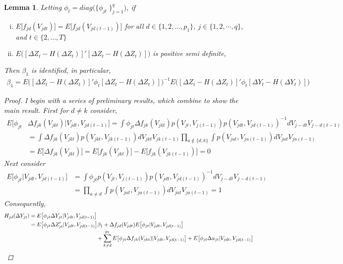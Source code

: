 \documentclass[10pt]{article}
\newtheorem{lemma}{Lemma}
\begin{document}
\begin{lemma}
Letting $\phi_{t} = diag\big( \{\phi_{jt}\;\}_{j=1}^q \big)$, if
\begin{enumerate}[i.)]
\item $E\big[ f_{jd}(V_{jdt})\big] = E\big[ f_{jd}(V_{jd(t-1)}) \big]
$ for all $d\in \{1,2, \ldots , p_1\}$, $j\in \{1,2, \cdots , q\}$, and $t\in \{2, \ldots , T\}$
%
\item $E \Big( [\Delta Z_t - H(\Delta Z_t)]' [\Delta Z_t - H(\Delta Z_t)] \Big)$ is positive semi definite,
%
\end{enumerate}
Then $\beta_1$ is identified, in particular,
\begin{align*}
\beta_1 = E \Big( [\Delta Z_t - H(\Delta Z_t)]' \phi_{t} [\Delta Z_t - H(\Delta Z_t)] \Big)^{-1}E \Big( [\Delta Z_t - H(\Delta Z_t)]' \phi_{t} [\Delta Y_t - H(\Delta Y_t)] \Big)
\end{align*}
%
\begin{proof} I begin with a series of preliminary results, which combine to show the main result. First for $d \neq k$ consider,
\begin{align*}
E \big[ \phi_{jt} & \Delta f_{jk}(V_{jkt}) |V_{jdt},V_{jd(t-1)} \big]  = \int \phi_{jt} \Delta f_{jk}(V_{jkt}) p(V_{jt},V_{j(t-1)})p(V_{jdt},V_{jd(t-1)})^{-1}dV_{j-dt}V_{j-d(t-1)} \\
%
& = \int \Delta f_{jk}(V_{jkt}) p(V_{jkt},V_{jk(t-1)}) dV_{jkt} V_{jk(t-1)}\prod_{a \notin\{d,k\}}\int p(V_{jat},V_{ja(t-1)}) dV_{jat} V_{ja(t-1)} \\
& = E\big[ \Delta f_{jk}(V_{jkt}) \big] = E\big[ f_{jk}(V_{jkt}) \big]  - E\big[ f_{jk}(V_{jk(t-1)}) \big] = 0
\end{align*}
Next consider
\begin{align*}
E\big[\phi_{jt} | V_{jdt},V_{jd(t-1)}\big] &= \int \phi_{jt}p(V_{jt},V_{j(t-1)})p(V_{jdt},V_{jd(t-1)})^{-1}dV_{j-dt}V_{j-d(t-1)} \\
%
&= \prod_{a \neq d }\int p(V_{jat},V_{ja(t-1)}) dV_{jat} V_{ja(t-1)}  = 1
\end{align*}
Consequently,
\begin{align*}
H_{jd}(\Delta Y_{jt}) &= E\big[ \phi_{jt} \Delta Y_{jt} | V_{jdt},V_{jd(t-1)} \big] \\
%
& =E \big[ \phi_{jt} \Delta Z_{jt}' | V_{jdt},V_{jd(t-1)} \big]\beta_1 + \Delta f_{jd}(V_{jdt})E\big[\phi_{jt} | V_{jdt},V_{jd(t-1)}\big] \\
%
 &\hspace{4.3cm} + \sum_{k\neq d}^{p_1} E \big[ \phi_{jt} \Delta f_{jk}(V_{jkt}) | V_{jdt},V_{jd(t-1)} \big] + E\big[  \phi_{jt}\Delta u_{jt} | V_{jdt},V_{jd(t-1)} \big]  \\

\end{align*}
\end{proof}
\end{lemma}
\end{document}
